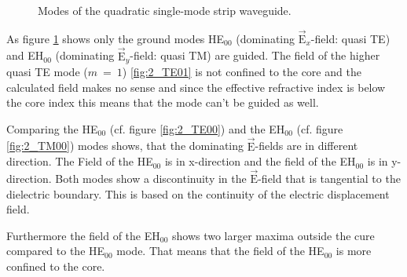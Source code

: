 \begin{figure}[ht]
\caption{Modes of the quadratic single-mode strip waveguide.}%
\label{fig:2_modes}%
\end{figure}
As figure \ref{fig:2_modes} shows only the ground modes HE$_{00}$ (dominating $\vec{\mathrm{E}}_x$-field: quasi TE) and EH$_{00}$ (dominating $\vec{\mathrm{E}}_y$-field: quasi TM) are guided. The field of the higher quasi TE mode ($m~=~1$) \ref{fig:2_TE01} is not confined to the core and the calculated field makes no sense and since the effective refractive index is below the core index this means that the mode can't be guided as well.

Comparing the HE$_{00}$ (cf. figure \ref{fig:2_TE00}) and the EH$_{00}$ (cf. figure \ref{fig:2_TM00}) modes shows, that the dominating $\vec{\mathrm{E}}$-fields are in different direction. The Field of the HE$_{00}$ is in x-direction and the field of the EH$_{00}$ is in y-direction. Both modes show a discontinuity in the $\vec{\mathrm{E}}$-field that is tangential to the dielectric boundary. This is based on the continuity of the electric displacement field.

Furthermore the field of the EH$_{00}$ shows two larger maxima outside the cure compared to the HE$_{00}$ mode. That means that the field of the HE$_{00}$ is more confined to the core.

